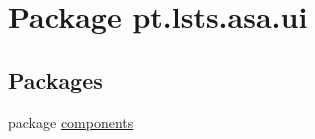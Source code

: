 \hypertarget{namespacept_1_1lsts_1_1asa_1_1ui}{}\section{Package pt.\+lsts.\+asa.\+ui}
\label{namespacept_1_1lsts_1_1asa_1_1ui}
\subsection*{Packages}
\begin{DoxyCompactItemize}
\item 
package \hyperlink{namespacept_1_1lsts_1_1asa_1_1ui_1_1components}{components}
\end{DoxyCompactItemize}
